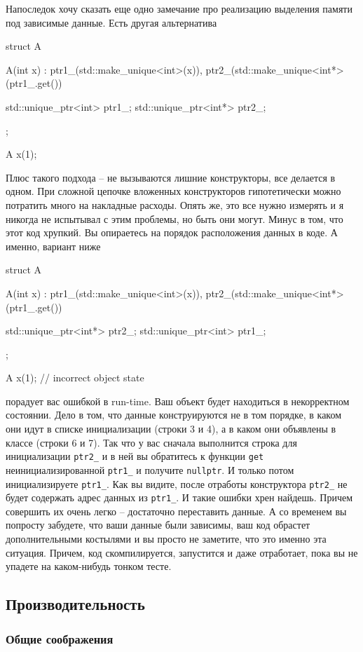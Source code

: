 \documentclass{article}
\begin{document}
Напоследок хочу сказать еще одно замечание про реализацию выделения памяти под зависимые данные. Есть другая альтернатива
\begin{cppcode}
struct A {
  A(int x)
   : ptr1_(std::make_unique<int>(x)),
     ptr2_(std::make_unique<int*>(ptr1_.get()) {}
  
  std::unique_ptr<int> ptr1_;
  std::unique_ptr<int*> ptr2_;
};

A x(1);
\end{cppcode}
Плюс такого подхода -- не вызываются лишние конструкторы, все делается в одном. При сложной цепочке вложенных конструкторов гипотетически можно потратить много на накладные расходы. Опять же, это все нужно измерять и я никогда не испытывал с этим проблемы, но быть они могут. Минус в том, что этот код хрупкий. Вы опираетесь на порядок расположения данных в коде. А именно, вариант ниже
\begin{cppcode}
struct A {
  A(int x)
   : ptr1_(std::make_unique<int>(x)),
     ptr2_(std::make_unique<int*>(ptr1_.get()) {}
  
  std::unique_ptr<int*> ptr2_;
  std::unique_ptr<int> ptr1_;
};

A x(1); // incorrect object state
\end{cppcode}
порадует вас ошибкой в run-time. Ваш объект будет находиться в некорректном состоянии. Дело в том, что данные конструируются не в том порядке, в каком они идут в списке инициализации (строки 3 и 4), а в каком они объявлены в классе (строки 6 и 7). Так что у вас сначала выполнится строка для инициализации \verb"ptr2_" и в ней вы обратитесь к функции \verb"get" неинициализированной \verb"ptr1_" и получите \verb"nullptr". И только потом инициализируете \verb"ptr1_". Как вы видите, после отработы конструктора \verb"ptr2_" не будет содержать адрес данных из \verb"ptr1_". И такие ошибки хрен найдешь. Причем совершить их очень легко -- достаточно переставить данные. А со временем вы попросту забудете, что ваши данные были зависимы, ваш код обрастет дополнительными костылями и вы просто не заметите, что это именно эта ситуация. Причем, код скомпилируется, запустится и даже отработает, пока вы не упадете на каком-нибудь тонком тесте.

\subsection{Производительность}

\subsubsection{Общие соображения}
\end{document}
